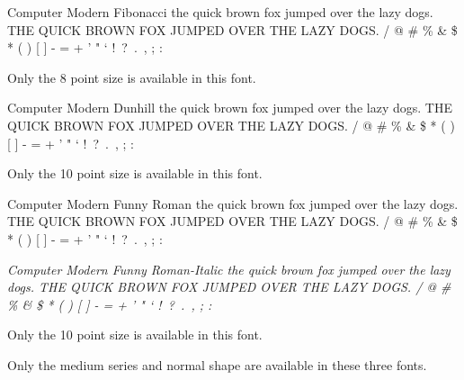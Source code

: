 \documentclass{article}
\begin{document}
\newpage
{\selectfont
Computer Modern Fibonacci \newline
the quick brown fox jumped over the lazy dogs. \newline
THE QUICK BROWN FOX JUMPED OVER THE LAZY DOGS.  / @ \# \% \& \$ * ( ) [ ] - = + ' " ` !\ ?\ .\ , ; : }\par
\noindent
Only the 8 point size is available in this font. \par
{\selectfont
Computer Modern Dunhill \newline
the quick brown fox jumped over the lazy dogs. \newline
THE QUICK BROWN FOX JUMPED OVER THE LAZY DOGS.  / @ \# \% \& \$ * ( ) [ ] - = + ' " ` !\ ?\ .\ , ; : }\par
\noindent
Only the 10 point size is available in this font. \par
{\selectfont
Computer Modern Funny Roman \newline
the quick brown fox jumped over the lazy dogs. \newline
THE QUICK BROWN FOX JUMPED OVER THE LAZY DOGS.  / @ \# \% \& \$ * ( ) [ ] - = + ' " ` !\ ?\ .\ , ; : \par
{\itshape
Computer Modern Funny Roman-Italic \newline
the quick brown fox jumped over the lazy dogs. \newline
THE QUICK BROWN FOX JUMPED OVER THE LAZY DOGS.  / @ \# \% \& \$ * ( ) [ ] - = + ' " ` !\ ?\ .\ , ; : }}\par
\noindent
Only the 10 point size is available in this font. \par
\noindent
Only the medium series and normal shape are available in these three fonts.
\par 
\newpage
\end{document}
